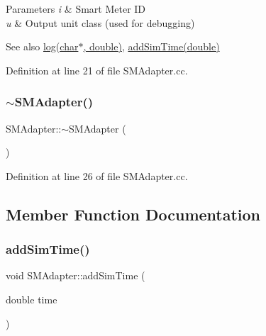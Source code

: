 \begin{DoxyParams}{Parameters}
{\em i} & Smart Meter ID \\
\hline
{\em u} & Output unit class (used for debugging) \\
\hline
\end{DoxyParams}
\begin{DoxySeeAlso}{See also}
\hyperlink{classSMAdapter_aecfd03fc0facc3c1a9b43cedce2d026a}{log(char$\ast$, double)}, \hyperlink{classSMAdapter_a695f8eb90b349dc6267eb82ec9f9ee93}{add\+Sim\+Time(double)} 
\end{DoxySeeAlso}


Definition at line 21 of file S\+M\+Adapter.\+cc.

\mbox{\label{classSMAdapter_a935746ba8f7210132ac6324efba1c210}} 
\subsubsection{\texorpdfstring{$\sim$\+S\+M\+Adapter()}{~SMAdapter()}}
{\footnotesize\ttfamily S\+M\+Adapter\+::$\sim$\+S\+M\+Adapter (\begin{DoxyParamCaption}{ }\end{DoxyParamCaption})}



Definition at line 26 of file S\+M\+Adapter.\+cc.



\subsection{Member Function Documentation}
\mbox{\label{classSMAdapter_a695f8eb90b349dc6267eb82ec9f9ee93}} 
\subsubsection{\texorpdfstring{add\+Sim\+Time()}{addSimTime()}}
{\footnotesize\ttfamily void S\+M\+Adapter\+::add\+Sim\+Time (\begin{DoxyParamCaption}\item[{double}]{time }\end{DoxyParamCaption})}

